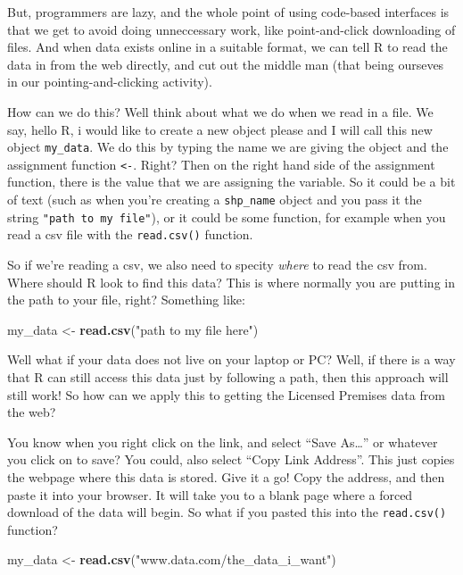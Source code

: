 \documentclass[]{book}
\newenvironment{Shaded}{\begin{snugshade}}{\end{snugshade}}
\newcommand{\KeywordTok}[1]{\textcolor[rgb]{0.13,0.29,0.53}{\textbf{#1}}}
\newcommand{\NormalTok}[1]{#1}
\newcommand{\StringTok}[1]{\textcolor[rgb]{0.31,0.60,0.02}{#1}}
\begin{document}
But, programmers are lazy, and the whole point of using code-based interfaces is that we get to avoid doing unneccessary work, like point-and-click downloading of files. And when data exists online in a suitable format, we can tell R to read the data in from the web directly, and cut out the middle man (that being ourseves in our pointing-and-clicking activity).

How can we do this? Well think about what we do when we read in a file. We say, hello R, i would like to create a new object please and I will call this new object \texttt{my\_data}. We do this by typing the name we are giving the object and the assignment function \texttt{\textless{}-}. Right? Then on the right hand side of the assignment function, there is the value that we are assigning the variable. So it could be a bit of text (such as when you're creating a \texttt{shp\_name} object and you pass it the string \texttt{"path\ to\ my\ file"}), or it could be some function, for example when you read a csv file with the \texttt{read.csv()} function.

So if we're reading a csv, we also need to specity \emph{where} to read the csv from. Where should R look to find this data? This is where normally you are putting in the path to your file, right? Something like:

\begin{Shaded}
\begin{Highlighting}[]
\NormalTok{my_data <-}\StringTok{ }\KeywordTok{read.csv}\NormalTok{(}\StringTok{"path to my file here"}\NormalTok{)}
\end{Highlighting}
\end{Shaded}

Well what if your data does not live on your laptop or PC? Well, if there is a way that R can still access this data just by following a path, then this approach will still work! So how can we apply this to getting the Licensed Premises data from the web?

You know when you right click on the link, and select ``Save As\ldots{}'' or whatever you click on to save? You could, also select ``Copy Link Address''. This just copies the webpage where this data is stored. Give it a go! Copy the address, and then paste it into your browser. It will take you to a blank page where a forced download of the data will begin. So what if you pasted this into the \texttt{read.csv()} function?

\begin{Shaded}
\begin{Highlighting}[]
\NormalTok{my_data <-}\StringTok{ }\KeywordTok{read.csv}\NormalTok{(}\StringTok{"www.data.com/the_data_i_want"}\NormalTok{)}
\end{Highlighting}
\end{Shaded}
\end{document}
